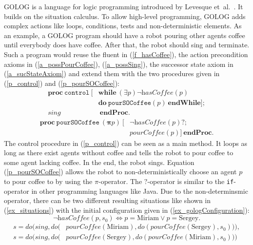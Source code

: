 GOLOG is a language for logic programming introduced by Levesque et~al.~\cite{levesque_golog:_1997}. It builds on the situation calculus. To allow high-level programming, GOLOG adds complex actions like loops, conditions, tests and non-deterministic elements. As an example, a GOLOG program should have a robot pouring other agents coffee until everybody does have coffee. After that, the robot should sing and terminate. Such a program would reuse the fluent in (\ref{f_hasCoffee}), the action precondition axioms in (\ref{a_possPourCoffee}), (\ref{a_possSing}), the successor state axiom in (\ref{a_sucStateAxiom}) and extend them with the two procedures given in (\ref{p_control}) and (\ref{p_pourSOCoffee}):
\begin{equation}\label{p_control}
  \begin{split}
    \textbf{proc}\ \texttt{control}\ [&\textbf{while}\ (\exists p) \neg\textit{hasCoffee}(p) \\
    &\textbf{do}\ \texttt{pourSOCoffee}(p)\ \textbf{endWhile}]; \\
    \textit{sing}&\ \textbf{endProc}.
  \end{split}
\end{equation}
\begin{equation}\label{p_pourSOCoffee}
  \begin{split}
    \textbf{proc}\ \texttt{pourSOCoffee}\ (\boldsymbol{\pi} p)\ [ &\neg\textit{hasCoffee}(p)\textbf{?}; \\
    &\textit{pourCoffee}(p)]\ \textbf{endProc}.
  \end{split}
\end{equation}
The control procedure in (\ref{p_control}) can be seen as a main method. It loops as long as there exist agents without coffee and tells the robot to pour coffee to some agent lacking coffee. In the end, the robot sings. Equation (\ref{p_pourSOCoffee}) allows the robot to non-deterministically choose an agent $p$ to pour coffee to by using the $\pi$-operator. The $?$-operator is similar to the \texttt{if}-operator in other programming languages like Java. Due to the non-determinsmic operator, there can be two different resulting situations like shown in (\ref{ex_situations}) with the initial configuration given in (\ref{ex_gologConfiguration}):
\begin{equation}\label{ex_gologConfiguration}
  \neg\textit{hasCoffee}(p,s_0) \Leftrightarrow p=\textrm{Miriam} \vee p=\textrm{Sergey}.
\end{equation}
\begin{equation}\label{ex_situations}
  \begin{split}
    s=\textit{do}\Big(\textit{sing},\textit{do}\big(&\textit{pourCoffee}(\textrm{Miriam}),
      \textit{do}(\textit{pourCoffee}(\textrm{Sergey}),s_0)\big)\Big),
\\  s=\textit{do}\Big(\textit{sing},\textit{do}\big(&\textit{pourCoffee}(\textrm{Sergey}),
      \textit{do}(\textit{pourCoffee}(\textrm{Miriam}),s_0)\big)\Big)
  \end{split}
\end{equation}

